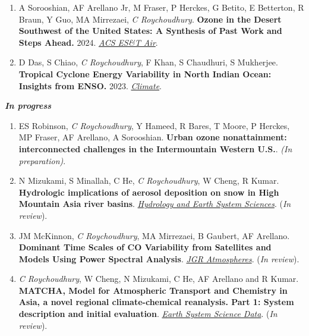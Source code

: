 \documentclass[margin,line]{resume}
\begin{document}
\begin{resume}
\begin{enumerate}[topsep=1pt, partopsep=1pt, itemsep=0.5pt, parsep=0.1pt, leftmargin=15pt,label=\arabic*.]
			\item A Sorooshian, AF Arellano Jr, M Fraser, P Herckes, G Betito, E Betterton, R Braun, Y Guo, MA Mirrezaei, \textit{C Roychoudhury}. \textbf{Ozone in the Desert Southwest of the United States: A Synthesis of Past Work and Steps Ahead.} 2024.  \href{https://doi.org/10.1021/acsestair.3c00033}{\textit{ACS ES\&T Air}}.
			
			\item D Das, S Chiao, \textit{C Roychoudhury}, F Khan, S Chaudhuri, S Mukherjee. \textbf{Tropical Cyclone Energy Variability in North Indian Ocean: Insights from ENSO.} 2023.
			\href{https://www.mdpi.com/2225-1154/11/12/232}{\textit{Climate}}.
			
		\end{enumerate}
		
		
		\textbf{\emph{\textcolor{sep}{{In progress}}}}
		\begin{enumerate}[topsep=1pt, partopsep=1pt, itemsep=0.5pt, parsep=0.1pt, leftmargin=15pt,label=\arabic*.]
			
			\item ES Robinson, \textit{C Roychoudhury}, Y Hameed, R Bares, T Moore, P Herckes, MP Fraser, AF Arellano, A Sorooshian. \textbf{Urban ozone nonattainment: interconnected challenges in the
				Intermountain Western U.S.}. \textit{(In preparation)}.
			
			\item N Mizukami, S Minallah, C He, \textit{C Roychoudhury}, W Cheng, R Kumar. \textbf{Hydrologic implications of aerosol deposition on snow in High
				Mountain Asia river basins}. \textit{\href{https://egusphere.copernicus.org/preprints/2025/egusphere-2025-4586/}{Hydrology and Earth System Sciences}}. (\textit{In review}).
			
			\item JM McKinnon, \textit{C Roychoudhury}, MA Mirrezaei, B Gaubert, AF Arellano.  \textbf{Dominant Time Scales of CO Variability from Satellites and Models Using Power Spectral Analysis}. \textit{\href{https://essopenarchive.org/users/1001156/articles/1361660-dominant-time-scales-of-co-variability-from-satellites-and-models-using-power-spectral-analysis}{JGR Atmospheres}}. (\textit{In review}).
			
			\item \textit{C Roychoudhury}, W Cheng, N Mizukami, C He, AF Arellano and R Kumar. \textbf{MATCHA, Model for Atmospheric Transport and Chemistry in Asia, a novel regional climate-chemical reanalysis. Part 1: System description and initial evaluation}. \textit{\href{https://essd.copernicus.org/preprints/essd-2025-275/}{Earth System Science Data}}. (\textit{In review}).
			

\end{enumerate}
\end{resume}
\end{document}
